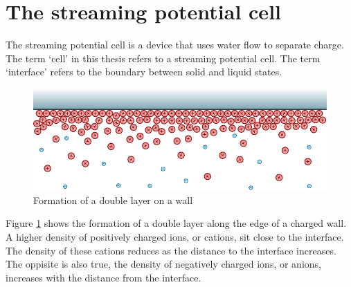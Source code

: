 
%
%
%



\section{The streaming potential cell}
\label{sect:streamingPotentialCell}

The streaming potential cell is a device that uses water flow to separate charge.
The term `cell' in this thesis refers to a streaming potential cell.
The term `interface' refers to the boundary between solid and liquid states.

\begin{figure}
    \centering
    \includegraphics{content/pt1/01-PowerHarvesting/graphics/doubleLayerOnWall}
    \caption{\label{fig:doubleLayerOnWall}Formation of a double layer on a wall}
\end{figure}

Figure \ref{fig:doubleLayerOnWall} shows the formation of a double layer along the edge of a charged wall.
A higher density of positively charged ions, or cations, sit close to the interface.
The density of these cations reduces as the distance to the interface increases.
The oppisite is also true, the density of negatively charged ions, or anions, increases with the distance from the interface.





